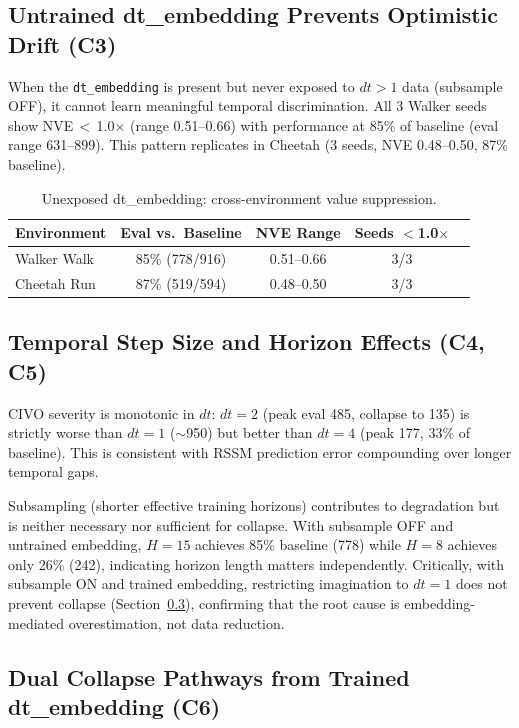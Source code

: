 \documentclass[10pt,letterpaper]{article}
\begin{document}
\subsection{Untrained dt\_embedding Prevents Optimistic Drift (C3)}

When the \texttt{dt\_embedding} is present but never exposed to $dt>1$ data (subsample OFF), it cannot learn meaningful temporal discrimination.
All 3 Walker seeds show NVE\,$<$\,1.0$\times$ (range 0.51--0.66) with performance at 85\% of baseline (eval range 631--899).
This pattern replicates in Cheetah (3 seeds, NVE 0.48--0.50, 87\% baseline).

\begin{table}[h]
\centering
\caption{Unexposed dt\_embedding: cross-environment value suppression.}
\label{tab:unexposed_cross_env}
\small
\begin{tabular}{@{}lcccc@{}}
\toprule
Environment & Eval vs.\ Baseline & NVE Range & Seeds $<$1.0$\times$ \\
\midrule
Walker Walk  & 85\% (778/916) & 0.51--0.66 & 3/3 \\
Cheetah Run  & 87\% (519/594) & 0.48--0.50 & 3/3 \\
\bottomrule
\end{tabular}
\end{table}

\subsection{Temporal Step Size and Horizon Effects (C4, C5)}

CIVO severity is monotonic in $dt$: $dt=2$ (peak eval 485, collapse to 135) is strictly worse than $dt=1$ ($\sim$950) but better than $dt=4$ (peak 177, 33\% of baseline).
This is consistent with RSSM prediction error compounding over longer temporal gaps.

Subsampling (shorter effective training horizons) contributes to degradation but is neither necessary nor sufficient for collapse.
With subsample OFF and untrained embedding, $H=15$ achieves 85\% baseline (778) while $H=8$ achieves only 26\% (242), indicating horizon length matters independently.
Critically, with subsample ON and trained embedding, restricting imagination to $dt=1$ does not prevent collapse (Section~\ref{sec:c6}), confirming that the root cause is embedding-mediated overestimation, not data reduction.

\subsection{Dual Collapse Pathways from Trained dt\_embedding (C6)}
\label{sec:c6}
\end{document}
